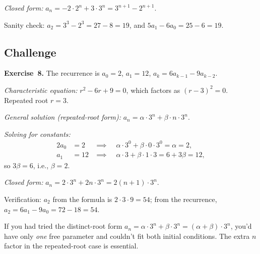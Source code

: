 \documentclass[11pt]{article}
\begin{document}
\emph{Closed form:} $a_n = -2 \cdot 2^n + 3 \cdot 3^n = 3^{n+1} - 2^{n+1}$.

Sanity check: $a_2 = 3^3 - 2^3 = 27 - 8 = 19$, and $5 a_1 - 6 a_0 = 25 - 6 = 19$. \checkmark

\subsection*{Challenge}

\textbf{Exercise~8.}
The recurrence is $a_0 = 2$, $a_1 = 12$, $a_k = 6 a_{k-1} - 9 a_{k-2}$.

\emph{Characteristic equation:} $r^2 - 6r + 9 = 0$, which factors as $(r - 3)^2 = 0$. Repeated root $r = 3$.

\emph{General solution (repeated-root form):} $a_n = \alpha \cdot 3^n + \beta \cdot n \cdot 3^n$.

\emph{Solving for constants:}
\begin{alignat*}{2}
  a_0 &= 2 &\;\implies\;\; & \alpha \cdot 3^0 + \beta \cdot 0 \cdot 3^0 = \alpha = 2, \\
  a_1 &= 12 &\;\implies\;\; & \alpha \cdot 3 + \beta \cdot 1 \cdot 3 = 6 + 3\beta = 12,
\end{alignat*}
so $3 \beta = 6$, i.e., $\beta = 2$.

\emph{Closed form:} $a_n = 2 \cdot 3^n + 2 n \cdot 3^n = 2(n + 1) \cdot 3^n$.

Verification: $a_2$ from the formula is $2 \cdot 3 \cdot 9 = 54$; from the recurrence, $a_2 = 6 a_1 - 9 a_0 = 72 - 18 = 54$. \checkmark

If you had tried the distinct-root form $a_n = \alpha \cdot 3^n + \beta \cdot 3^n = (\alpha + \beta) \cdot 3^n$, you'd have only \emph{one} free parameter and couldn't fit both initial conditions. The extra $n$ factor in the repeated-root case is essential.
\end{document}

